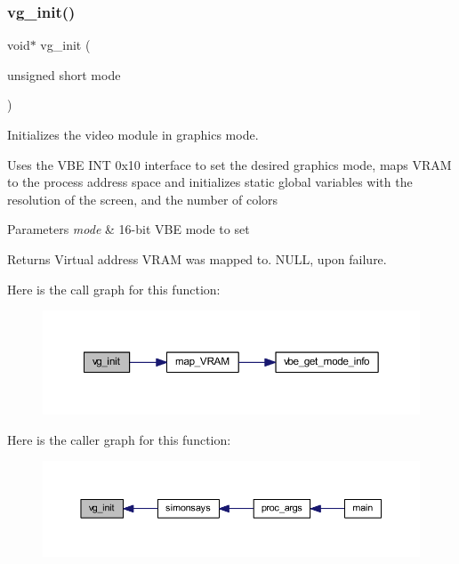 \subsubsection{\texorpdfstring{vg\+\_\+init()}{vg\_init()}}
{\footnotesize\ttfamily void$\ast$ vg\+\_\+init (\begin{DoxyParamCaption}\item[{unsigned short}]{mode }\end{DoxyParamCaption})}



Initializes the video module in graphics mode. 

Uses the V\+BE I\+NT 0x10 interface to set the desired graphics mode, maps V\+R\+AM to the process\textquotesingle{} address space and initializes static global variables with the resolution of the screen, and the number of colors


\begin{DoxyParams}{Parameters}
{\em mode} & 16-\/bit V\+BE mode to set \\
\hline
\end{DoxyParams}
\begin{DoxyReturn}{Returns}
Virtual address V\+R\+AM was mapped to. N\+U\+LL, upon failure. 
\end{DoxyReturn}
Here is the call graph for this function\+:\nopagebreak
\begin{figure}[H]
\begin{center}
\leavevmode
\includegraphics[width=350pt]{group__video__gr_gacef21667c79365d57a084bed994c2189_cgraph}
\end{center}
\end{figure}
Here is the caller graph for this function\+:\nopagebreak
\begin{figure}[H]
\begin{center}
\leavevmode
\includegraphics[width=350pt]{group__video__gr_gacef21667c79365d57a084bed994c2189_icgraph}
\end{center}
\end{figure}

